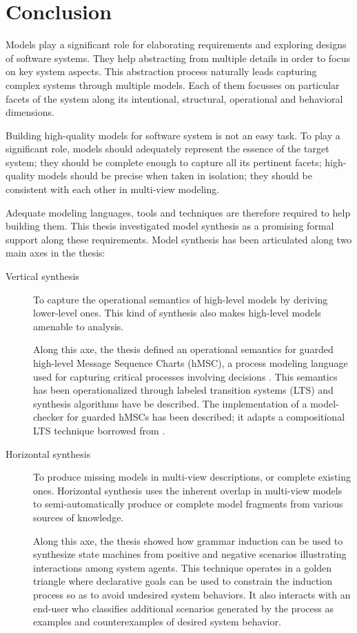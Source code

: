 \chapter{Conclusion\label{chapter:conclusion}}

Models play a significant role for elaborating requirements and exploring designs of software systems. They help abstracting from multiple details in order to focus on key system aspects. This abstraction process naturally leads capturing complex systems through multiple models. Each of them focusses on particular facets of the system along its intentional, structural, operational and behavioral dimensions.

Building high-quality models for software system is not an easy task. To play a significant role, models should adequately represent the essence of the target system; they should be complete enough to capture all its pertinent facets; high-quality models should be precise when taken in isolation; they should be consistent with each other in multi-view modeling. 

Adequate modeling languages, tools and techniques are therefore required to help building them. This thesis investigated model synthesis as a promising formal support along these requirements. Model synthesis has been articulated along two main axes in the thesis:
\begin{description}
\item[Vertical synthesis] To capture the operational semantics of high-level models by deriving lower-level ones. This kind of synthesis also makes high-level models amenable to analysis.

Along this axe, the thesis defined an operational semantics for guarded high-level Message Sequence Charts (hMSC), a process modeling language used for capturing critical processes involving decisions \cite{Damas:2011}. This semantics has been operationalized through labeled transition systems (LTS) and synthesis algorithms have be described. The implementation of a model-checker for guarded hMSCs has been described; it adapts a compositional LTS technique borrowed from \cite{Giannakopoulou:2003}.

\item[Horizontal synthesis] To produce missing models in multi-view descriptions, or complete existing ones. Horizontal synthesis uses the inherent overlap in multi-view models to semi-automatically produce or complete model fragments from various sources of knowledge.

Along this axe, the thesis showed how grammar induction can be used to synthesize state machines from positive and negative scenarios illustrating interactions among system agents. This technique operates in a golden triangle where declarative goals can be used to constrain the induction process so as to avoid undesired system behaviors. It also interacts with an end-user who classifies additional scenarios generated by the process as examples and counterexamples of desired system behavior.
\end{description}

